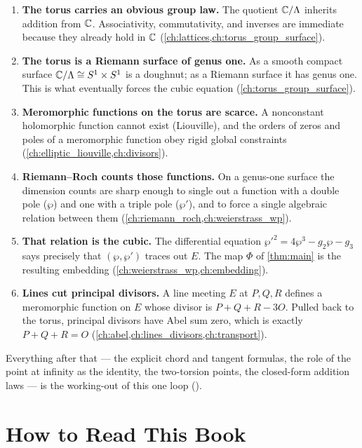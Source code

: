 \begin{enumerate}
\item \textbf{The torus carries an obvious group law.} The quotient
\(\mathbb{C}/\Lambda\) inherits addition from \(\mathbb{C}\). Associativity, commutativity, and
inverses are immediate because they already hold in \(\mathbb{C}\)
(\cref{ch:lattices,ch:torus_group_surface}).

\item \textbf{The torus is a Riemann surface of genus one.} As a smooth compact
surface \(\mathbb{C}/\Lambda \cong S^1 \times S^1\) is a doughnut; as a Riemann surface
it has genus one. This is what eventually forces the cubic equation
(\cref{ch:torus_group_surface}).

\item \textbf{Meromorphic functions on the torus are scarce.} A nonconstant
holomorphic function cannot exist (Liouville), and the orders of zeros and poles
of a meromorphic function obey rigid global constraints
(\cref{ch:elliptic_liouville,ch:divisors}).

\item \textbf{Riemann--Roch counts those functions.} On a genus-one surface the
dimension counts are sharp enough to single out a function with a double pole
(\(\wp\)) and one with a triple pole (\(\wp'\)), and to force a single algebraic
relation between them (\cref{ch:riemann_roch,ch:weierstrass_wp}).

\item \textbf{That relation is the cubic.} The differential equation
\(\wp'^2 = 4\wp^3 - g_2\wp - g_3\) says precisely that \((\wp,\wp')\) traces out
\(E\). The map \(\Phi\) of \cref{thm:main} is the resulting embedding
(\cref{ch:weierstrass_wp,ch:embedding}).

\item \textbf{Lines cut principal divisors.} A line meeting \(E\) at \(P,Q,R\)
defines a meromorphic function on \(E\) whose divisor is
\(P + Q + R - 3O\). Pulled back to the torus, principal divisors have Abel sum
zero, which is exactly \(P + Q + R = O\)
(\cref{ch:abel,ch:lines_divisors,ch:transport}).
\end{enumerate}

Everything after that --- the explicit chord and tangent formulas, the role of
the point at infinity as the identity, the two-torsion points, the closed-form
addition laws --- is the working-out of this one loop
().

\section{How to Read This Book}
\label{sec:intro-reading}

